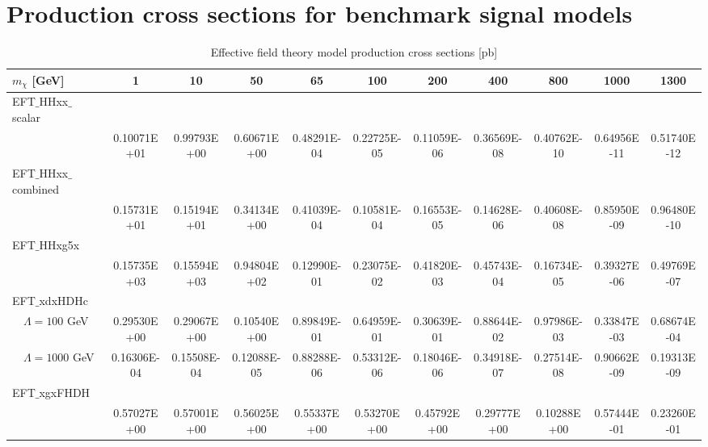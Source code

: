 \chapter{Production cross sections for benchmark signal models}

\begin{sidewaystable}[htbH]
\begin{adjustbox}{width=\textwidth,totalheight=\textheight,keepaspectratio}
\label{tab:eftxsecs}
\begin{tabular}{l | c | c | c | c | c | c | c | c | c | c}
\hline 
$m_\chi$ [GeV] & 1 & 10 & 50 & 65 & 100 & 200 & 400 & 800 & 1000 & 1300 \\
\hline
EFT$\_$HHxx$\_$scalar & & & & & & & & & & \\
 & 0.10071E+01 & 0.99793E+00 & 0.60671E+00 & 0.48291E-04 & 0.22725E-05 & 0.11059E-06 & 0.36569E-08 & 0.40762E-10 & 0.64956E-11 & 0.51740E-12 \\
EFT$\_$HHxx$\_$combined & & & & & & & & & & \\
 & 0.15731E+01 & 0.15194E+01 & 0.34134E+00 & 0.41039E-04 & 0.10581E-04 & 0.16553E-05 & 0.14628E-06 & 0.40608E-08 & 0.85950E-09 & 0.96480E-10 \\
EFT$\_$HHxg5x & & & & & & & & & & \\
 & 0.15735E+03 & 0.15594E+03 & 0.94804E+02 & 0.12990E-01 & 0.23075E-02 & 0.41820E-03 & 0.45743E-04 & 0.16734E-05 & 0.39327E-06 & 0.49769E-07 \\
EFT$\_$xdxHDHc & & & & & & & & & & \\
$\quad \Lambda = 100$ GeV & 0.29530E+00 & 0.29067E+00 & 0.10540E+00 & 0.89849E-01 & 0.64959E-01 & 0.30639E-01 & 0.88644E-02 & 0.97986E-03 & 0.33847E-03 & 0.68674E-04 \\
$\quad \Lambda = 1000$ GeV & 0.16306E-04 & 0.15508E-04 & 0.12088E-05 & 0.88288E-06 & 0.53312E-06 & 0.18046E-06 & 0.34918E-07 & 0.27514E-08 & 0.90662E-09 & 0.19313E-09 \\
EFT$\_$xgxFHDH & & & & & & & & & & \\
 & 0.57027E+00 & 0.57001E+00 & 0.56025E+00 & 0.55337E+00 & 0.53270E+00 & 0.45792E+00 & 0.29777E+00 & 0.10288E+00 & 0.57444E-01 & 0.23260E-01 \\
\hline
\end{tabular}
\end{adjustbox}
\caption{Effective field theory model production cross sections [pb]}
\end{sidewaystable}

